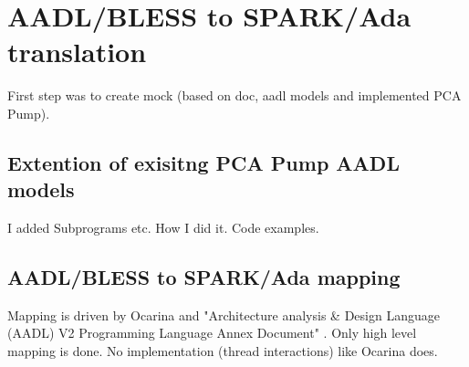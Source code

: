 
\cleardoublepage


\chapter{AADL/BLESS to SPARK/Ada translation}
\label{codegen}

First step was to create mock (based on doc, aadl models and implemented PCA Pump).


\section{Extention of exisitng PCA Pump AADL models}
\label{codegen:existing-models}
I added Subprograms etc.
How I did it. Code examples.

\section{AADL/BLESS to SPARK/Ada mapping}
\label{codegen:mapping}
Mapping is driven by Ocarina and "Architecture analysis \& Design Language (AADL) V2 Programming Language Annex Document" \cite{AnnexDoc13}.
Only high level mapping is done. No implementation (thread interactions) like Ocarina does. 

